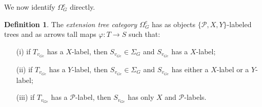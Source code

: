 \documentclass[a4paper,10pt
,draft
]{article}%
\numberwithin{equation}{section}
\numberwithin{figure}{section}
\theoremstyle{definition} %
\newtheorem{definition}[equation]{Definition}%
\newcommand{\1}{\ensuremath{\mathbbm 1}}%
\begin{document}
We now identify $\Omega_G^{e}$ directly.


\begin{definition}\label{EXTTREECAT DEF}
	The \textit{extension tree category $\Omega_G^e$}
	has as objects $\{\mathcal{P},X,Y\}$-labeled trees
	and as arrows tall maps $\varphi \colon T \to S$ such that:
	\begin{itemize}
		\item[(i)] if $T_{v_{Ge}}$ has a $X$-label, then 
		$S_{v_{Ge}} \in \Sigma_G$ and $S_{v_{Ge}}$ has a $X$-label;
		\item[(ii)] if $T_{v_{Ge}}$ has a $Y$-label, then 
		$S_{v_{Ge}} \in \Sigma_G$ and $S_{v_{Ge}}$ has either a $X$-label or a $Y$-label;
		\item[(iii)] if $T_{v_{Ge}}$ has a $\mathcal{P}$-label, then 
		$S_{v_{Ge}}$ has only $X$ and $\mathcal{P}$-labels.
	\end{itemize}
\end{definition}
\end{document}
